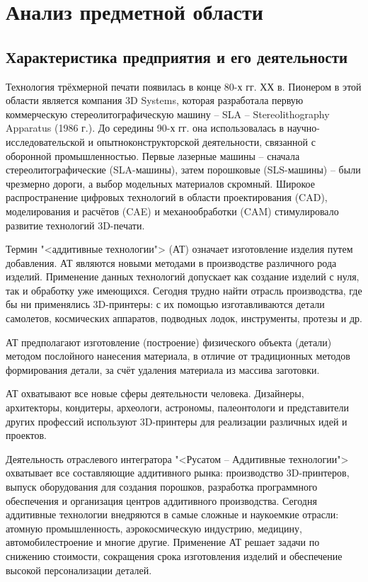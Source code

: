 \section{Анализ предметной области}
\subsection{Характеристика предприятия и его деятельности}

Технология трёхмерной печати появилась в конце 80-х гг. ХХ в. Пионером в этой области является компания 3D Systems, которая разработала первую коммерческую стереолитографическую машину – SLA – \linebreak Stereolithography Apparatus (1986 г.). До середины 90-х гг. она использовалась в научно-исследовательской и опытноконструкторской деятельности, связанной с оборонной промышленностью. Первые лазерные машины – сначала стереолитографические (SLA-машины), затем порошковые (SLS-машины) – были чрезмерно дороги, а выбор модельных материалов скромный. Широкое распространение цифровых технологий в области проектирования (CAD), моделирования и расчётов (CAE) и механообработки (CAM) стимулировало развитие технологий 3D-печати. 

Термин "<аддитивные технологии"> (АТ) означает изготовление изделия путем добавления. АТ являются новыми методами в производстве различного рода изделий. Применение данных технологий допускает как создание изделий с нуля, так и обработку уже имеющихся. Сегодня трудно найти отрасль производства, где бы ни применялись 3D-принтеры: с их помощью изготавливаются детали самолетов, космических аппаратов, подводных лодок, инструменты, протезы и др.

АТ предполагают изготовление (построение) физического объекта (детали) методом послойного нанесения материала, в отличие от традиционных методов формирования детали, за счёт удаления материала из массива заготовки.

АТ охватывают все новые сферы деятельности человека. Дизайнеры, архитекторы, кондитеры, археологи, астрономы, палеонтологи и представители других профессий используют 3D-принтеры для реализации различных идей и проектов. 

Деятельность отраслевого интегратора "<Русатом -- Аддитивные технологии"> охватывает все составляющие аддитивного рынка: производство 3D-принтеров, выпуск оборудования для создания порошков, разработка программного обеспечения и организация центров аддитивного производства. Сегодня аддитивные технологии внедряются в самые сложные и наукоемкие отрасли: атомную промышленность, аэрокосмическую индустрию, медицину, автомобилестроение и многие другие. Применение АТ решает задачи по снижению стоимости, сокращения срока изготовления изделий и обеспечение высокой персонализации деталей.
